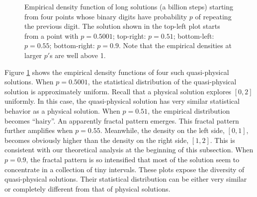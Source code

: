 \begin{figure}
\caption{Empirical density function of long solutions (a billion steps)
starting from four points whose binary digits have probability $p$ of
repeating the previous digit.
The solution shown in the top-left plot starts from a point with $p=0.5001$;
top-right: $p=0.51$; bottom-left: $p=0.55$; bottom-right: $p=0.9$.
Note that the empirical densities at larger $p'$s are well above 1.}
\label{fig:tent_quasiphysical}
\end{figure}

Figure \ref{fig:tent_quasiphysical} shows the empirical density functions of
four such quasi-physical solutions.  When $p=0.5001$,
the statistical distribution of the quasi-physical solution
is approximately uniform.  Recall that a physical solution explores $[0,2]$
uniformly.  In this case, the quasi-physical solution has very similar
statistical behavior as a physical solution.  When $p=0.51$, the empirical
distribution becomes ``hairy''.  An apparently fractal pattern emerges.
This fractal pattern further amplifies when $p=0.55$.  Meanwhile,
the density on the left side, $[0,1]$, becomes obviously higher than
the density on the right side, $[1,2]$.  This is consistent with our
theoretical analysis at the beginning of this subsection.
When $p=0.9$, the fractal pattern is so intensified that most
of the solution seem to concentrate in a collection of tiny intervals.
These plots expose the diversity of quasi-physical solutions.
Their statistical distribution can be either
very similar or completely different from that of physical solutions.

